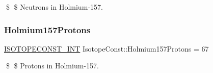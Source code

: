 \$ \$ Neutrons in Holmium-\/157. \mbox{\label{group___isotope_const-_holmium-_ho157_ga62f8edbb44ea0c5c0a6bf9ff3984979f}} 
\subsubsection{\texorpdfstring{Holmium157\+Protons}{Holmium157Protons}}
{\footnotesize\ttfamily \mbox{\hyperlink{group___isotope_const-_macros_ga5f18360b3e99483a35c32d789e62621c}{I\+S\+O\+T\+O\+P\+E\+C\+O\+N\+S\+T\+\_\+\+I\+NT}} Isotope\+Const\+::\+Holmium157\+Protons = 67}

\$ \$ Protons in Holmium-\/157. 